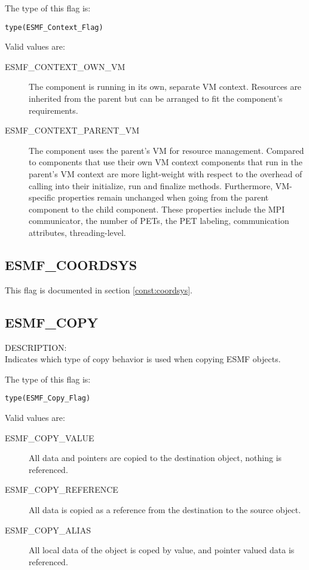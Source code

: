 The type of this flag is:

{\tt type(ESMF\_Context\_Flag)}

Valid values are:
\begin{description}

\item [ESMF\_CONTEXT\_OWN\_VM]
         The component is running in its own, separate VM context. Resources
         are inherited from the parent but can be arranged to fit the
         component's requirements.
\item [ESMF\_CONTEXT\_PARENT\_VM]
         The component uses the parent's VM for resource management. Compared
         to components that use their own VM context components that run in the
         parent's VM context are more light-weight with respect to the overhead
         of calling into their initialize, run and finalize methods.
         Furthermore, VM-specific properties remain unchanged when going from
         the parent component to the child component. These properties include
         the MPI communicator, the number of PETs, the PET labeling, 
         communication attributes, threading-level.
\end{description}

\subsection{ESMF\_COORDSYS}
This flag is documented in section \ref{const:coordsys}.

\subsection{ESMF\_COPY}
\label{const:copy}
{\sf DESCRIPTION:\\}
Indicates which type of copy behavior is used when copying ESMF objects.

The type of this flag is:

{\tt type(ESMF\_Copy\_Flag)}

Valid values are:
\begin{description}
	\item[ESMF\_COPY\_VALUE]
	All data and pointers are copied to the destination object, nothing is referenced.
	\item[ESMF\_COPY\_REFERENCE]
	All data is copied as a reference from the destination to the source object.
	\item[ESMF\_COPY\_ALIAS]
	All local data of the object is coped by value, and pointer valued data is referenced.
\end{description}

